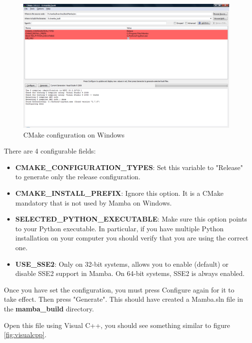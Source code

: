 \documentclass[a4paper,10pt,oneside]{article}
\begin{document}
\begin{figure}
\centering
\includegraphics[scale=0.3]{images/cmake_win.png}
\caption{CMake configuration on Windows}
\label{fig:cmake_win}
\end{figure}

There are 4 configurable fields:
\begin{itemize}
\item \textbf{CMAKE\_CONFIGURATION\_TYPES}: Set this variable to "Release" to 
generate only the release configuration.
\item \textbf{CMAKE\_INSTALL\_PREFIX}: Ignore this option. It is a CMake 
mandatory that is not used by Mamba on Windows.
\item \textbf{SELECTED\_PYTHON\_EXECUTABLE}: Make sure this option points 
to your Python executable. In particular, if you have multiple Python 
installation on your computer you should verify that you are using the 
correct one.
\item \textbf{USE\_SSE2}: Only on 32-bit systems, allows you to enable (default)
or disable SSE2 support in Mamba. On 64-bit systems, SSE2 is always enabled.
\end{itemize}

Once you have set the configuration, you must press Configure again for it to
take effect. Then press "Generate". This should have created a Mamba.sln file
in the \textbf{mamba\_build} directory.

Open this file using Visual C++, you should see something similar to figure
\ref{fig:visualcpp}.
\end{document}
